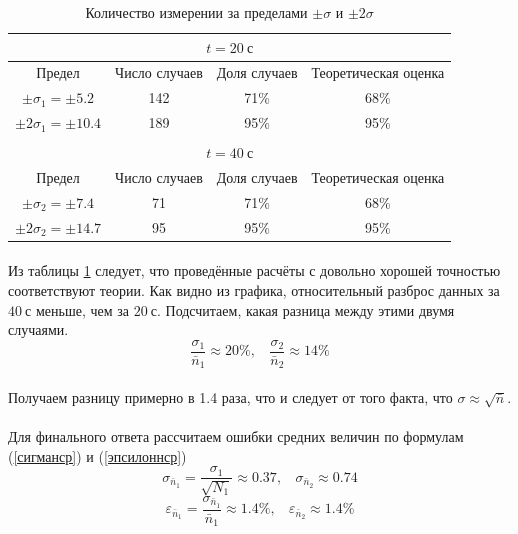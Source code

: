 \documentclass[a4paper, 12pt]{article}
\begin{document}
    \begin{table}[ht!]
    \begin{center}
    \begin{tabular}{|c|c|c|c|}
    	\hline
    	\multicolumn{4}{|c|}{$t=20 \ с$}                                                 \\ \hline
    	          Предел           & Число случаев & Доля случаев & Теоретическая оценка \\ \hline
    	 $\pm \sigma_1 = \pm 5.2$  &      142      &     71\%     &         68\%         \\
    	$\pm 2\sigma_1 = \pm 10.4$ &      189      &     95\%     &         95\%         \\ \hline
    	                              \multicolumn{4}{c}{}                               \\ \hline
    	\multicolumn{4}{|c|}{$t=40 \ с$}                                                 \\ \hline
    	          Предел           & Число случаев & Доля случаев & Теоретическая оценка \\ \hline
    	 $\pm \sigma_2 = \pm 7.4$  &      71       &     71\%     &         68\%         \\
    	$\pm 2\sigma_2 = \pm 14.7$ &      95       &     95\%     &         95\%         \\ \hline
    \end{tabular}
    \caption{Количество измерении за пределами $\pm\sigma$ и $\pm2\sigma$} \label{pmsigma}
    \end{center}
    \end{table}

    \paragraph{}
    Из таблицы \ref{pmsigma} следует, что проведённые расчёты с довольно хорошей точностью соответствуют теории. Как видно из графика, относительный разброс данных за $40 \ с$ меньше, чем за $20 \ с$. Подсчитаем, какая разница между этими двумя случаями.
    \[\frac{\sigma_1}{\bar{n}_1} \approx 20\%, \ \ \ \ \frac{\sigma_2}{\bar{n}_2} \approx 14\%\]
    \paragraph{}
    Получаем разницу примерно в 1.4 раза, что и следует от того факта, что $\sigma \approx \sqrt{\bar{n}}$.
    \paragraph{}
    Для финального ответа рассчитаем ошибки средних величин по формулам (\ref{сигманср}) и (\ref{эпсилоннср})
    \[\sigma_{\bar{n}_1} = \frac{\sigma_{1}}{\sqrt{N_1}} \approx 0.37, \ \ \ \  \sigma_{\bar{n}_2} \approx 0.74\]
    \[\varepsilon_{\bar{n}_1} = \frac{\sigma_{\bar{n}_1}}{\bar{n}_1}\approx 1.4\%, \ \ \ \  \varepsilon_{\bar{n}_2}\approx 1.4\%\]
    
\end{document}
